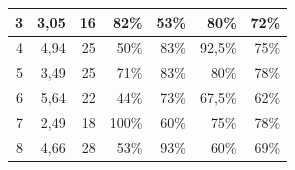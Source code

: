 \begin{table}[h]
\begin{tabular}{|r|r|r|r|r|r|r|}
3                                                                                      & 3,05                                                                                                  & 16                                                                                                 & 82\%                               & 53\%                                & 80\%                                     & 72\%                               \\ \hline
4                                                                                      & 4,94                                                                                                  & 25                                                                                                 & 50\%                               & 83\%                                & 92,5\%                                   & 75\%                               \\ \hline
5                                                                                      & 3,49                                                                                                  & 25                                                                                                 & 71\%                               & 83\%                                & 80\%                                     & 78\%                               \\ \hline
6                                                                                      & 5,64                                                                                                  & 22                                                                                                 & 44\%                               & 73\%                                & 67,5\%                                   & 62\%                               \\ \hline
7                                                                                      & 2,49                                                                                                  & 18                                                                                                 & 100\%                              & 60\%                                & 75\%                                     & 78\%                               \\ \hline
8                                                                                      & 4,66                                                                                                  & 28                                                                                                 & 53\%                               & 93\%                                & 60\%                                     & 69\%                               \\ \hline

\end{tabular}
\end{table}
